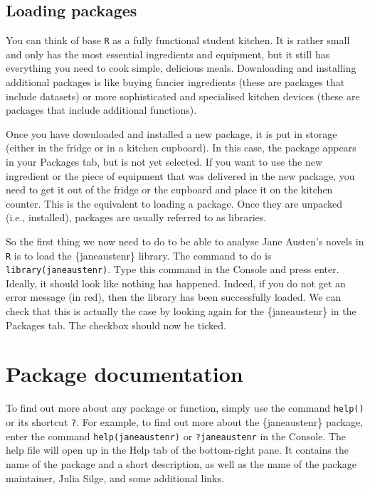 \documentclass[
  letterpaper,
  DIV=11,
  numbers=noendperiod,
  oneside]{scrreprt}
\begin{document}
\subsection{Loading packages}\label{loading-packages}

You can think of base \texttt{R} as a fully functional student kitchen.
It is rather small and only has the most essential ingredients and
equipment, but it still has everything you need to cook simple,
delicious meals. Downloading and installing additional packages is like
buying fancier ingredients (these are packages that include datasets) or
more sophisticated and specialised kitchen devices (these are packages
that include additional functions).

Once you have downloaded and installed a new package, it is put in
storage (either in the fridge or in a kitchen cupboard). In this case,
the package appears in your Packages tab, but is not yet selected. If
you want to use the new ingredient or the piece of equipment that was
delivered in the new package, you need to get it out of the fridge or
the cupboard and place it on the kitchen counter. This is the equivalent
to loading a package. Once they are unpacked (i.e., installed), packages
are usually referred to as libraries.

So the first thing we now need to do to be able to analyse Jane Austen's
novels in \texttt{R} is to load the \{janeaustenr\} library. The command
to do is \texttt{library(janeaustenr)}. Type this command in the Console
and press enter. Ideally, it should look like nothing has happened.
Indeed, if you do not get an error message (in red), then the library
has been successfully loaded. We can check that this is actually the
case by looking again for the \{janeaustenr\} in the Packages tab. The
checkbox should now be ticked. {}

\section{Package documentation}\label{package-documentation}

To find out more about any package or function, simply use the command
\texttt{help()} or its shortcut \texttt{?}. For example, to find out
more about the \{janeaustenr\} package, enter the command
\texttt{help(janeaustenr)} or \texttt{?janeaustenr} in the Console. The
help file will open up in the Help tab of the bottom-right pane. It
contains the name of the package and a short description, as well as the
name of the package maintainer, Julia Silge, and some additional links.
\end{document}
